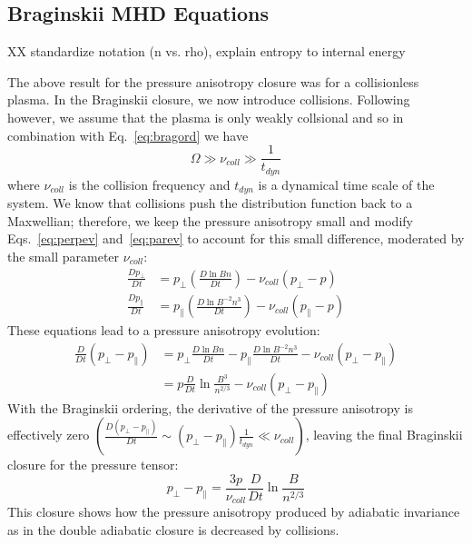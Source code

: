 \subsection{Braginskii MHD Equations} \label{ssec:bragclosure}
XX standardize notation (n vs. rho), explain entropy to internal energy

The above result for the pressure anisotropy closure was for a collisionless plasma. In the Braginskii closure, we now introduce collisions. Following~\citet{KunzBraginskii} however, we assume that the plasma is only weakly collsional and so in combination with Eq.~\ref{eq:bragord} we have
\begin{equation*}
  \Omega\gg\nu_{coll}\gg \frac1{t_{dyn}}
\end{equation*}
where $\nu_{coll}$ is the collision frequency and $t_{dyn}$ is a dynamical time scale of the system. We know that collisions push the distribution function back to a Maxwellian; therefore, we keep the pressure anisotropy small and modify Eqs.~\ref{eq:perpev} and~\ref{eq:parev} to account for this small difference, moderated by the small parameter $\nu_{coll}$:
\begin{align*}
  \frac{Dp_\perp}{Dt}&=p_\perp\left(\frac{D\ln Bn}{Dt}\right)-\nu_{coll}(p_\perp-p)\\
  \frac{Dp_\parallel}{Dt}&=p_\parallel\left(\frac{D\ln B^{-2}n^3}{Dt}\right)-\nu_{coll}(p_\parallel-p)
\end{align*}
These equations lead to a pressure anisotropy evolution:
\begin{align*}
  \frac{D}{Dt}(p_\perp-p_\parallel)&=p_\perp\frac{D\ln Bn}{Dt}-p_\parallel\frac{D\ln B^{-2}n^3}{Dt}-\nu_{coll}(p_\perp-p_\parallel)\\
  &=p\frac{D}{Dt}\ln\frac{B^3}{n^{2/3}}-\nu_{coll}(p_\perp-p_\parallel)
\end{align*}
With the Braginskii ordering, the derivative of the pressure anisotropy is effectively zero $\left(\frac{D(p_\perp-p_\parallel)}{Dt}\sim (p_\perp-p_\parallel)\frac1{t_{dyn}}\ll\nu_{coll}\right)$, leaving the final Braginskii closure for the pressure tensor:
\begin{equation}
  p_\perp-p_\parallel=\frac{3p}{\nu_{coll}}\frac{D}{Dt}\ln\frac{B}{n^{2/3}} \label{eq:bragclosure}
\end{equation}
This closure shows how the pressure anisotropy produced by adiabatic invariance as in the double adiabatic closure is decreased by collisions. \\
